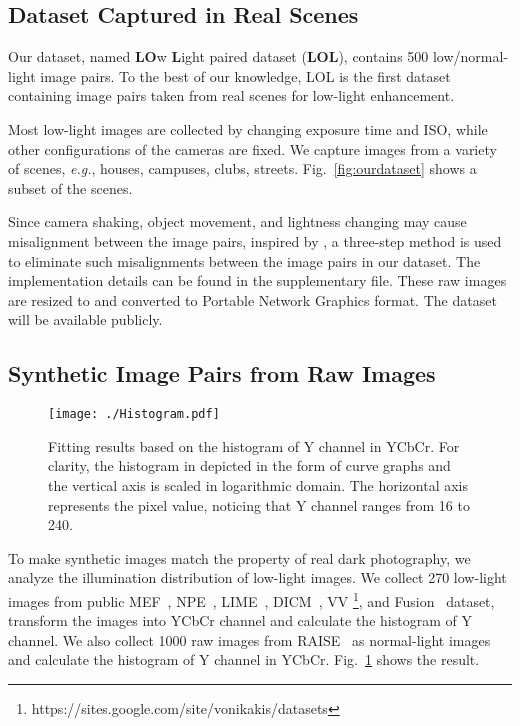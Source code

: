 \documentclass{bmvc2k}
\begin{document}
\subsection{Dataset Captured in Real Scenes}
Our dataset, named \textbf{LO}w \textbf{L}ight paired dataset (\textbf{LOL}), contains 500 low/normal-light image pairs. To the best of our knowledge, LOL is the first dataset containing image pairs taken from real scenes for low-light enhancement.

Most low-light images are collected by changing exposure time and ISO, while other configurations of the cameras are fixed. We capture images from a variety of scenes, \textit{e.g.}, houses, campuses, clubs, streets. Fig.~\ref{fig:ourdataset} shows a subset of the scenes.

Since camera shaking, object movement, and lightness changing may cause misalignment between the image pairs, inspired by \cite{Anaya2017RENOIR}, a three-step method is used to eliminate such misalignments between the image pairs in our dataset. The implementation details can be found in the supplementary file. These raw images are resized to  and converted to Portable Network Graphics format. The dataset will be available publicly.

\subsection{Synthetic Image Pairs from Raw Images}
\begin{figure}[t]
	\centering
	\begin{minipage}[t]{\linewidth}
		\centering
		\texttt{[image: ./Histogram.pdf]}
		\end{minipage}
    \vspace{-0.6 cm}
	\caption{Fitting results based on the histogram of Y channel in YCbCr. For clarity, the histogram in depicted in the form of curve graphs and the vertical axis is scaled in logarithmic domain. The horizontal axis represents the pixel value, noticing that Y channel ranges from 16 to 240. }
	\label{fig:histogram}
	\end{figure}

To make synthetic images match the property of real dark photography, we analyze the illumination distribution of low-light images. We collect 270 low-light images from public MEF~\cite{Ma2015Perceptual}, NPE~\cite{Wang2013Naturalness}, LIME~\cite{Guo2017LIME}, DICM~\cite{Lee2013Contrast}, VV \footnote{https://sites.google.com/site/vonikakis/datasets}, and Fusion~\cite{dabov2006image} dataset, transform the images into YCbCr channel and calculate the histogram of Y channel. We also collect 1000 raw images from RAISE~\cite{Dang2015RAISE} as normal-light images and calculate the histogram of Y channel in YCbCr. Fig.~\ref{fig:histogram} shows the result.
\end{document}
